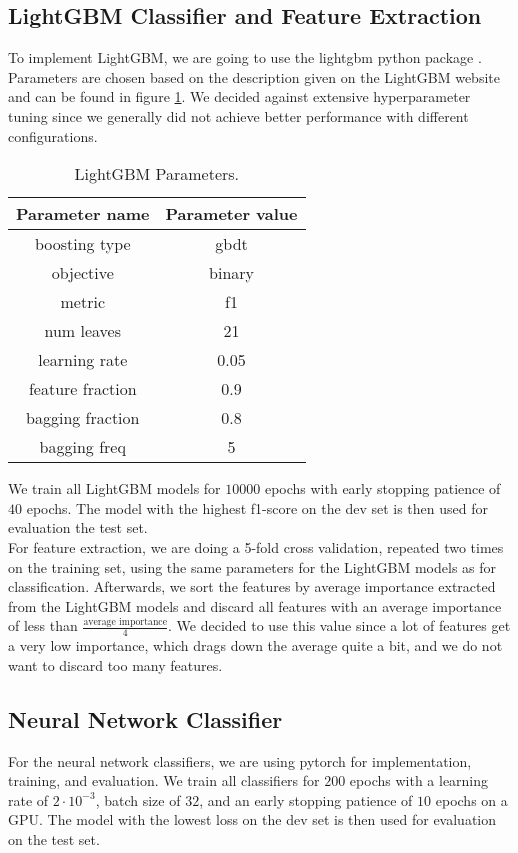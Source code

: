 \subsection{LightGBM Classifier and Feature Extraction}
To implement LightGBM, we are going to use the lightgbm python package \cite{lgbmpython}. Parameters are chosen based on the description given on the LightGBM website \cite{lgbmpython} and can be found in figure \ref{fig:lgbmparams}. We decided against extensive hyperparameter tuning since we generally did not achieve better performance with different configurations.

\begin{table}[H]
  \begin{center}
   	\begin{tabular}{|| c | c ||}
   	\hline
   	Parameter name & Parameter value \\
   	\hline\hline
   	boosting type & gbdt \\
 	\hline
 	objective & binary \\
 	\hline
 	metric & f1 \\
 	\hline
 	num leaves & 21 \\
 	\hline
 	learning rate & 0.05 \\
 	\hline
 	feature fraction & 0.9 \\
 	\hline
 	bagging fraction & 0.8 \\
 	\hline
 	bagging freq & 5 \\
 	\hline
	\end{tabular}
  \end{center}
  \caption{LightGBM Parameters.}%
  \label{fig:lgbmparams}
\end{table}

We train all LightGBM models for $10000$ epochs with early stopping patience of $40$ epochs. The model with the highest f1-score on the dev set is then used for evaluation the test set. \\
For feature extraction, we are doing a 5-fold cross validation, repeated two times on the training set, using the same parameters for the LightGBM models as for classification. Afterwards, we sort the features by average importance extracted from the LightGBM models and discard all features with an average importance of less than $\frac{\text{average importance}}{4}$. We decided to use this value since a lot of features get a very low importance, which drags down the average quite a bit, and we do not want to discard too many features.


\subsection{Neural Network Classifier}
For the neural network classifiers, we are using pytorch \cite{pytorch} for implementation, training, and evaluation. We train all classifiers for $200$ epochs with a learning rate of $2 \cdot 10^{-3}$, batch size of $32$, and an early stopping patience of $10$ epochs on a GPU. The model with the lowest loss on the dev set is then used for evaluation on the test set.

